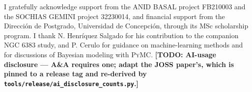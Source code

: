 \documentclass{aa}
\newcommand{\TODO}[1]{\textbf{[TODO: #1]}}
\begin{document}
\begin{acknowledgements}
  I gratefully acknowledge support from the ANID BASAL project FB210003 and the SOCHIAS GEMINI
  project 32230014, and financial support from the Direcci\'on de Postgrado, Universidad de
  Concepci\'on, through its MSc scholarship program. I thank N. Henr\'iquez Salgado for his
  contribution to the companion NGC 6383 study, and P. Cerulo for guidance on machine-learning
  methods and for discussions of Bayesian modeling with \textsc{PyMC}.
  \TODO{AI-usage disclosure --- A\&A requires one; adapt the JOSS paper's, which is pinned to a
  release tag and re-derived by \texttt{tools/release/ai\_disclosure\_counts.py}.}
\end{acknowledgements}



\end{document}

